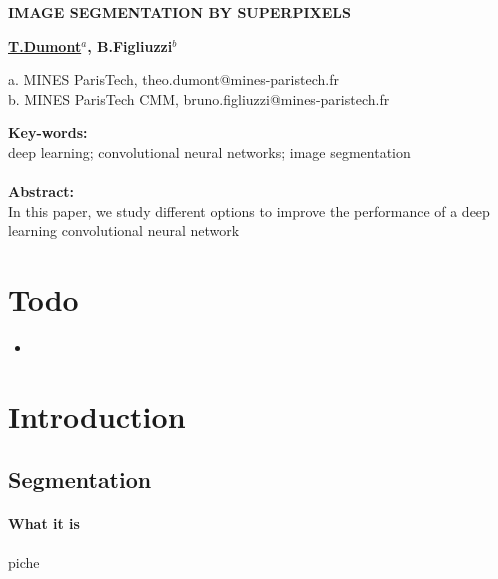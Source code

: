 \documentclass{article}
\begin{document}
\newcommand{\spp}{superpixel}

\begin{center}
    \begin{Large}\textbf{IMAGE SEGMENTATION BY SUPERPIXELS}\end{Large}

    \vspace{1cm}
    \begin{large}\textbf{\underline{T.Dumont$^a$}, B.Figliuzzi$^b$}\end{large}

    \vspace{0.5cm}
    a. MINES ParisTech, theo.dumont@mines-paristech.fr\\
    b. MINES ParisTech CMM, bruno.figliuzzi@mines-paristech.fr
    \vspace{1cm}
\end{center}

\begin{center}
\noindent\textbf{Key-words: }\\
deep learning; convolutional neural networks; image segmentation\\
\ \\
\textbf{Abstract: }\\
In this paper, we study different options to improve the performance of a deep learning convolutional neural network
\end{center}

\tableofcontents

\section*{Todo}
\begin{itemize}
    \item
\end{itemize}

\newpage
\section{Introduction}

    \subsection{Segmentation}
            \paragraph{What it is}piche
\end{document}

